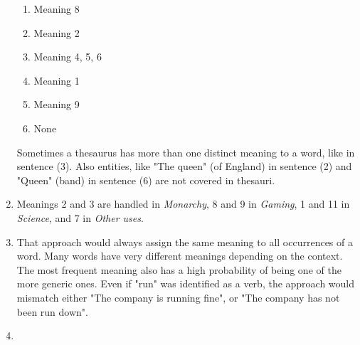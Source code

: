 \documentclass[10pt,a4paper]{article}
\begin{document}
\begin{enumerate}
\begin{enumerate}[label={(\arabic*)}]
            \item Meaning 8
            \item Meaning 2
            \item Meaning 4, 5, 6
            \item Meaning 1
            \item Meaning 9
            \item None
        \end{enumerate}
        Sometimes a thesaurus has more than one distinct meaning to a word, like in sentence (3). Also entities, like "The queen" (of England) in sentence (2) and "Queen" (band) in sentence (6) are not covered in thesauri.
    \item Meanings 2 and 3 are handled in \textit{Monarchy}, 8 and 9 in \textit{Gaming}, 1 and 11 in \textit{Science}, and 7 in \textit{Other uses}.
    \item That approach would always assign the same meaning to all occurrences of a word. Many words have very different meanings depending on the context. The most frequent meaning also has a high probability of being one of the more generic ones. Even if "run" was identified as a verb, the approach would mismatch either "The company is running fine", or "The company has not been run down".
    \item 
\end{enumerate}


\newpage
\end{document}
